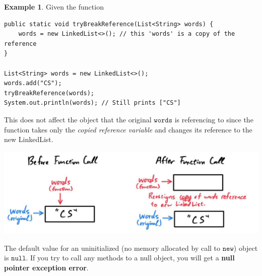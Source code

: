 \documentclass{article}
\theoremstyle{definition}
\newtheorem{example}{Example}[section]
\theoremstyle{remark}
\theoremstyle{definition}
\begin{document}
\begin{example}
Given the function 
\begin{verbatim}
public static void tryBreakReference(List<String> words) {
    words = new LinkedList<>(); // this 'words' is a copy of the reference 
}

List<String> words = new LinkedList<>(); 
words.add("CS"); 
tryBreakReference(words); 
System.out.println(words); // Still prints ["CS"]
\end{verbatim}
This does not affect the object that the original $\texttt{words}$ is referencing to since the function takes only the \textit{copied reference variable} and changes its reference to the new LinkedList. 
\begin{center}
    \includegraphics[scale=0.3]{img/func_ref_example2.jpg}
\end{center}
\end{example}

The default value for an uninitialized (no memory allocated by call to $\texttt{new}$) object is $\texttt{null}$. If you try to call any methods to a null object, you will get a \textbf{null pointer exception error}. 
\end{document}
